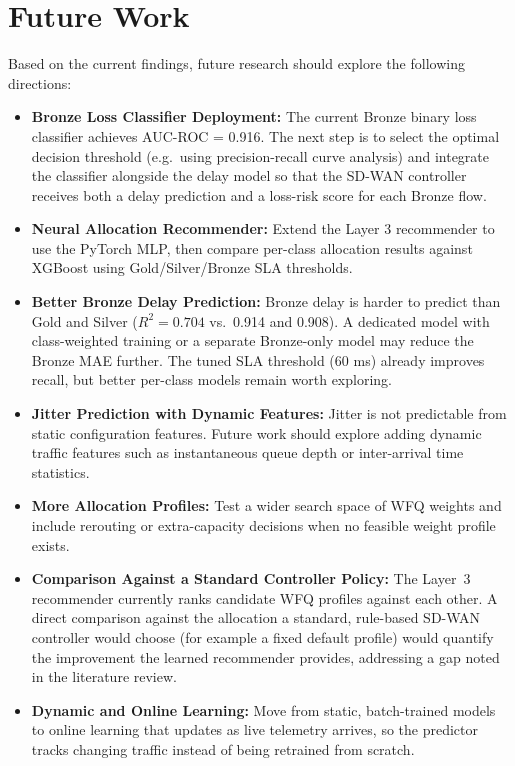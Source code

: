 \documentclass[a4paper,12pt]{Classes/RoboticsLaTeX}
\begin{document}
\section{Future Work}

Based on the current findings, future research should explore the following directions:
\begin{itemize}
    \item \textbf{Bronze Loss Classifier Deployment:} The current Bronze binary loss classifier achieves AUC-ROC = 0.916. The next step is to select the optimal decision threshold (e.g.\ using precision-recall curve analysis) and integrate the classifier alongside the delay model so that the SD-WAN controller receives both a delay prediction and a loss-risk score for each Bronze flow.
    \item \textbf{Neural Allocation Recommender:} Extend the Layer 3 recommender to use the PyTorch MLP, then compare per-class allocation results against XGBoost using Gold/Silver/Bronze SLA thresholds.
    \item \textbf{Better Bronze Delay Prediction:} Bronze delay is harder to predict than Gold and Silver ($R^2 = 0.704$ vs.\ 0.914 and 0.908). A dedicated model with class-weighted training or a separate Bronze-only model may reduce the Bronze MAE further. The tuned SLA threshold (60 ms) already improves recall, but better per-class models remain worth exploring.
    \item \textbf{Jitter Prediction with Dynamic Features:} Jitter is not predictable from static configuration features. Future work should explore adding dynamic traffic features such as instantaneous queue depth or inter-arrival time statistics.
    \item \textbf{More Allocation Profiles:} Test a wider search space of WFQ weights and include rerouting or extra-capacity decisions when no feasible weight profile exists.
    \item \textbf{Comparison Against a Standard Controller Policy:} The Layer~3 recommender currently ranks candidate WFQ profiles against each other. A direct comparison against the allocation a standard, rule-based SD-WAN controller would choose (for example a fixed default profile) would quantify the improvement the learned recommender provides, addressing a gap noted in the literature review.
    \item \textbf{Dynamic and Online Learning:} Move from static, batch-trained models to online learning that updates as live telemetry arrives, so the predictor tracks changing traffic instead of being retrained from scratch.

\end{itemize}
\end{document}
